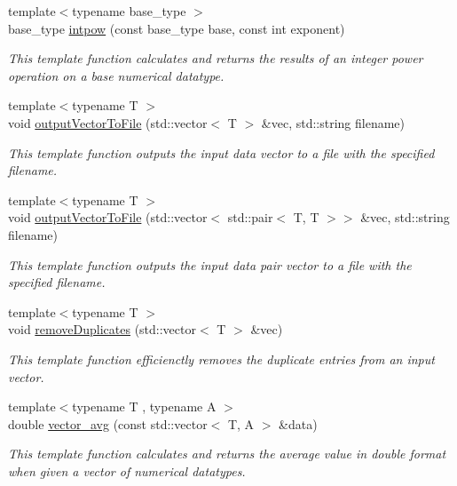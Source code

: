 \begin{DoxyCompactItemize}
{\footnotesize template$<$typename base\+\_\+type $>$ }\\base\+\_\+type \hyperlink{namespace_utils_affd19edaa58a3f8425e1f7b4c9233f8a}{intpow} (const base\+\_\+type base, const int exponent)
\begin{DoxyCompactList}\small\item\em This template function calculates and returns the results of an integer power operation on a base numerical datatype. \end{DoxyCompactList}\item 
{\footnotesize template$<$typename T $>$ }\\void \hyperlink{namespace_utils_ab76081fb0fa0e9e1633b1b2255db4164}{output\+Vector\+To\+File} (std\+::vector$<$ T $>$ \&vec, std\+::string filename)
\begin{DoxyCompactList}\small\item\em This template function outputs the input data vector to a file with the specified filename. \end{DoxyCompactList}\item 
{\footnotesize template$<$typename T $>$ }\\void \hyperlink{namespace_utils_a652ab00e72bce852c2b9798ff3e1a60b}{output\+Vector\+To\+File} (std\+::vector$<$ std\+::pair$<$ T, T $>$$>$ \&vec, std\+::string filename)
\begin{DoxyCompactList}\small\item\em This template function outputs the input data pair vector to a file with the specified filename. \end{DoxyCompactList}\item 
{\footnotesize template$<$typename T $>$ }\\void \hyperlink{namespace_utils_a5f64d00eec0b50ac5bd119652c99d01b}{remove\+Duplicates} (std\+::vector$<$ T $>$ \&vec)
\begin{DoxyCompactList}\small\item\em This template function efficienctly removes the duplicate entries from an input vector. \end{DoxyCompactList}\item 
{\footnotesize template$<$typename T , typename A $>$ }\\double \hyperlink{namespace_utils_acbc030ce708229ea393215fe13e6377b}{vector\+\_\+avg} (const std\+::vector$<$ T, A $>$ \&data)
\begin{DoxyCompactList}\small\item\em This template function calculates and returns the average value in double format when given a vector of numerical datatypes. \end{DoxyCompactList}\item 
$$
\end{DoxyCompactItemize}
